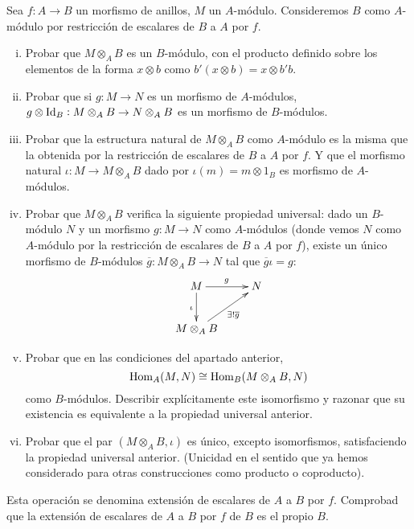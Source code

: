 \documentclass[../../../main.tex]{subfiles}
\begin{document}
\setcounter{exercici}{49}
\begin{exercici}
\label{exercici:extensioEscalars}\label{propietatUniversalExtensioEscalars} Sea $f:A\to B$ un morfismo de anillos, $M$ un $A$-módulo. Consideremos $B$ como $A$-módulo por restricción de escalares de $B$ a $A$ por $f$.
\begin{enumerate}[(i)]
    \item Probar que $M\otimes_AB$ es un $B$-módulo, con el producto definido sobre los elementos de la forma $x\otimes b$ como $b'(x\otimes b ) = x\otimes b'b$.
    \item Probar que si $g:M\to N$ es un morfismo de $A$-módulos, $g\otimes \operatorname{Id}_B:M\otimes_AB\to N\otimes_AB$ es un morfismo de $B$-módulos.
    \item Probar que la estructura natural de $M\otimes_AB$ como $A$-módulo es la misma que la obtenida por la restricción de escalares de $B$ a $A$ por $f$. Y que el morfismo natural $\iota:M\to M\otimes_AB$ dado por $\iota(m) = m\otimes 1_B $ es morfismo de $A$-módulos.
    \item Probar que $M\otimes_AB$ verifica la siguiente propiedad universal: dado un $B$-módulo $N$ y un morfismo $g:M\to N$ como $A$-módulos (donde vemos $N$ como $A$-módulo por la restricción de escalares de $B$ a $A$ por $f$), existe un único morfismo de $B$-módulos $\overline{g}:M\otimes_AB\to N$ tal que $\overline{g}\iota = g$:
    \begin{equation}
        \notag
        \xymatrix{
        M\ar[r]^g\ar[d]_\iota & N\\
        M\otimes_AB\ar[ur]_{\exists!\overline{g}}
        }
    \end{equation}
    \item Probar que en las condiciones del apartado anterior, 
    \begin{equation}
        \notag
        \operatorname{Hom}_A(M,N)\cong \operatorname{Hom}_B(M\otimes_AB,N)
    \end{equation}
    como $B$-módulos. Describir explícitamente este isomorfismo y razonar que su existencia es equivalente a la propiedad universal anterior.
    \item Probar que el par $(M\otimes_AB,\iota)$ es único, excepto isomorfismos, satisfaciendo la propiedad universal anterior. (Unicidad en el sentido que ya hemos considerado para otras construcciones como producto o coproducto).
\end{enumerate}
Esta operación se denomina extensión de escalares de $A$ a $B$ por $f$. Comprobad que la extensión de escalares de $A$ a $B$ por $f$ de $B$ es el propio $B$.
\end{exercici}
\end{document}

